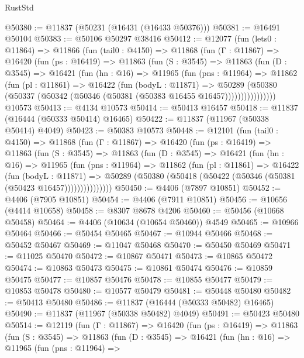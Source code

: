 \begin{lexlean}{RustStd}
\begin{coremodule}
@50380 := @11837 (@50231 (@16431 (@16433 @50376)))
@50381 := @16491 @50104
@50383 := @50106 @50297 @38416
@50412 := @12077
    (fun (lets0 : @11864) =>
    @11866
      (fun (tail0 : @4150) =>
      @11868
        (fun (Γ : @11867) =>
        @16420
          (fun (ps : @16419) =>
          @11863
            (fun (S : @3545) =>
            @11863
              (fun (D : @3545) =>
              @16421
                (fun (hn : @16) =>
                @11965
                  (fun (pns : @11964) =>
                  @11862
                    (fun (pl : @11861) =>
                    @16422
                      (fun (bodyL : @11871) =>
                      @50289
                        (@50380
                          (@50337 (@50342 (@50346 (@50381 (@50383 @16455 @16457))))))))))))))))
    @10573
@50413 := @4134 @10573
@50414 := @50413 @16457
@50418 := @11837 (@16444 (@50333 @50414) @16465)
@50422 := @11837 (@11967 (@50338 @50414) @4049)
@50423 := @50383 @10573
@50448 := @12101
    (fun (tail0 : @4150) =>
    @11868
      (fun (Γ : @11867) =>
      @16420
        (fun (ps : @16419) =>
        @11863
          (fun (S : @3545) =>
          @11863
            (fun (D : @3545) =>
            @16421
              (fun (hn : @16) =>
              @11965
                (fun (pns : @11964) =>
                @11862
                  (fun (pl : @11861) =>
                  @16422
                    (fun (bodyL : @11871) =>
                    @50289 (@50380 (@50418 (@50422 (@50346 (@50381 (@50423 @16457)))))))))))))))
@50450 := @4406 (@7897 @10851)
@50452 := @4406 (@7905 @10851)
@50454 := @4406 (@7911 @10851)
@50456 := @10656 (@4414 @10658)
@50458 := @8307 @8678 @4206
@50460 := @50456 (@10668 @50458)
@50464 := @4406 (@10634 (@10654 @50460)) @4549
@50465 := @10966 @50464
@50466 := @50454 @50465
@50467 := @10944 @50466
@50468 := @50452 @50467
@50469 := @11047 @50468
@50470 := @50450 @50469
@50471 := @11025 @50470
@50472 := @10867 @50471
@50473 := @10865 @50472
@50474 := @10863 @50473
@50475 := @10861 @50474
@50476 := @10859 @50475
@50477 := @10857 @50476
@50478 := @10855 @50477
@50479 := @10853 @50478
@50480 := @10577 @50479
@50481 := @50448 @50480
@50482 := @50413 @50480
@50486 := @11837 (@16444 (@50333 @50482) @16465)
@50490 := @11837 (@11967 (@50338 @50482) @4049)
@50491 := @50423 @50480
@50514 := @12119
    (fun (Γ : @11867) =>
    @16420
      (fun (ps : @16419) =>
      @11863
        (fun (S : @3545) =>
        @11863
          (fun (D : @3545) =>
          @16421
            (fun (hn : @16) =>
            @11965
              (fun (pns : @11964) =>

\end{coremodule}
\end{lexlean}
